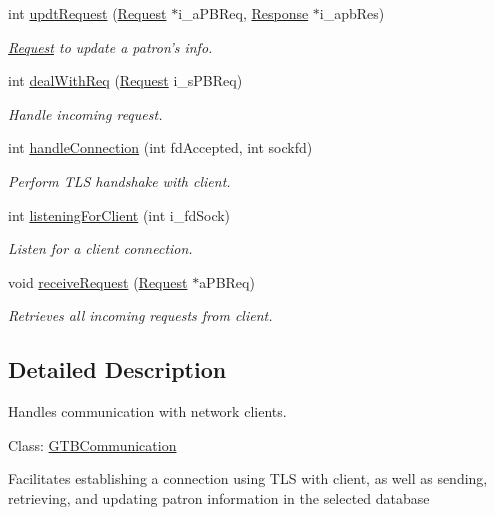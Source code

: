 \begin{DoxyCompactItemize}
int \hyperlink{classGTBCommunication_afd6c49f0bd73a7c2014673b58c87c68b}{updt\-Request} (\hyperlink{classRequest}{Request} $\ast$i\-\_\-a\-P\-B\-Req, \hyperlink{classResponse}{Response} $\ast$i\-\_\-apb\-Res)
\begin{DoxyCompactList}\small\item\em \hyperlink{classRequest}{Request} to update a patron's info. \end{DoxyCompactList}\item 
int \hyperlink{classGTBCommunication_ac0d209ae00b1820f5f29ec7d15f418d6}{deal\-With\-Req} (\hyperlink{classRequest}{Request} i\-\_\-s\-P\-B\-Req)
\begin{DoxyCompactList}\small\item\em Handle incoming request. \end{DoxyCompactList}\item 
int \hyperlink{classGTBCommunication_a6353b9cc417d4f7a3fd309fc911cf8f1}{handle\-Connection} (int fd\-Accepted, int sockfd)
\begin{DoxyCompactList}\small\item\em Perform T\-L\-S handshake with client. \end{DoxyCompactList}\item 
int \hyperlink{classGTBCommunication_a2f5260afdc69079471e21fd855e7dcc3}{listening\-For\-Client} (int i\-\_\-fd\-Sock)
\begin{DoxyCompactList}\small\item\em Listen for a client connection. \end{DoxyCompactList}\item 
void \hyperlink{classGTBCommunication_a0a4e58a46cc8f6037439473442b474b6}{receive\-Request} (\hyperlink{classRequest}{Request} $\ast$a\-P\-B\-Req)
\begin{DoxyCompactList}\small\item\em Retrieves all incoming requests from client. \end{DoxyCompactList}\end{DoxyCompactItemize}


\subsection{Detailed Description}
Handles communication with network clients. 

Class\-: \hyperlink{classGTBCommunication}{G\-T\-B\-Communication}

Facilitates establishing a connection using T\-L\-S with client, as well as sending, retrieving, and updating patron information in the selected database 

